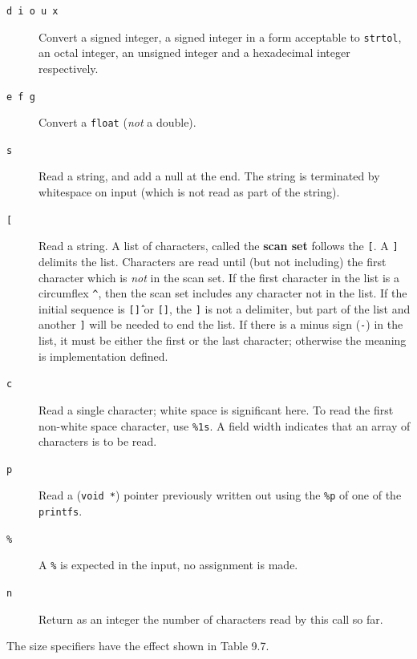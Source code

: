    \begin{description}
    \item[\texttt{d i o u x}] Convert a signed integer, a signed integer in a form
     acceptable to \texttt{strtol}, an octal integer, an unsigned
     integer and a hexadecimal integer respectively.

    \item[\texttt{e f g}] Convert a \texttt{float} (\textit{not} a double).

    \item[\texttt{s}] Read a string, and add a null at the end.  The string is
     terminated by whitespace on input (which is not read as
     part of the string).

    \item[\texttt{[}] Read a string.  A list of characters, called the \textbf{scan set}
     follows the \texttt{[}. A \texttt{]} delimits the list. Characters
     are read until (but not including) the first character which is
     \textit{not} in the scan set.  If the first character in the list
     is a circumflex \texttt{\^}, then the scan set includes any
     character not in the list.  If the initial sequence is
     \texttt{[\^]} or \texttt{[]}, the \texttt{]} is not a
     delimiter, but part of the list and another \texttt{]} will be needed
     to end the list.  If there is a minus sign (\texttt{-}) in the list,
     it must be either the first or the last character; otherwise the meaning
     is implementation defined.

    \item[\texttt{c}] Read a single character; white space is significant here.
     To read the first non-white space character, use \texttt{\%1s}.  A
     field width indicates that an array of characters is to
     be read.

    \item[\texttt{p}] Read a (\texttt{void *}) pointer previously written out using
     the \texttt{\%p} of one of the \texttt{printfs}.

    \item[\texttt{\%}] A \texttt{\%} is expected in the input, no assignment is made.

    \item[\texttt{n}] Return as an integer the number of characters read by
     this call so far.
   \end{description}

   The size specifiers have the effect shown in Table 9.7.


